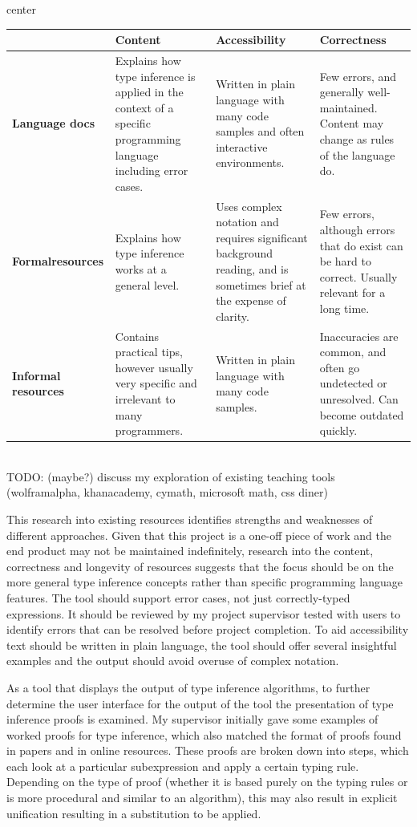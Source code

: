 \documentclass[a4paper,fleqn,oneside,12pt]{report}
\begin{document}
\begin{adjustbox}{center}\begin{tabularx}{1.2\textwidth}{ |p{2cm}|X|X|X| }
  \hline
   & \textbf{Content} & \textbf{Accessibility} & \textbf{Correctness} \\
  \hline
  \textbf{Language docs} & Explains how type inference is applied in the context of a specific programming language including error cases. & Written in plain language with many code samples and often interactive environments. & Few errors, and generally well-maintained. Content may change as rules of the language do. \\
  \hline
  \textbf{Formal\newline resources} & Explains how type inference works at a general level. & Uses complex notation and requires significant background reading, and is sometimes brief at the expense of clarity. & Few errors, although errors that do exist can be hard to correct. Usually relevant for a long time. \\
  \hline
  \textbf{Informal resources} & Contains practical tips, however usually very specific and irrelevant to many programmers. & Written in plain language with many code samples. & Inaccuracies are common, and often go undetected or unresolved. Can become outdated quickly. \\
  \hline
\end{tabularx}\end{adjustbox}\\

TODO: (maybe?) discuss my exploration of existing teaching tools (wolframalpha, khanacademy, cymath, microsoft math, css diner)

This research into existing resources identifies strengths and weaknesses of different approaches. Given that this project is a one-off piece of work and the end product may not be maintained indefinitely, research into the content, correctness and longevity of resources suggests that the focus should be on the more general type inference concepts rather than specific programming language features. The tool should support error cases, not just correctly-typed expressions. It should be reviewed by my project supervisor tested with users to identify errors that can be resolved before project completion. To aid accessibility text should be written in plain language, the tool should offer several insightful examples and the output should avoid overuse of complex notation.

As a tool that displays the output of type inference algorithms, to further determine the user interface for the output of the tool the presentation of type inference proofs is examined. My supervisor initially gave some examples of worked proofs for type inference, which also matched the format of proofs found in papers and in online resources. These proofs are broken down into steps, which each look at a particular subexpression and apply a certain typing rule. Depending on the type of proof (whether it is based purely on the typing rules or is more procedural and similar to an algorithm), this may also result in explicit unification resulting in a substitution to be applied.
\end{document}
